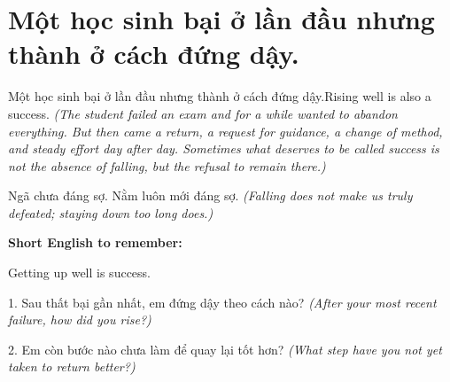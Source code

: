 \section{Một học sinh bại ở lần đầu nhưng thành ở cách đứng dậy.}
\begin{truyen}{Một học sinh bại ở lần đầu nhưng thành ở cách đứng dậy.}{Rising well is also a success.}
\textit{(The student failed an exam and for a while wanted to abandon everything. But then came a return, a request for guidance, a change of method, and steady effort day after day. Sometimes what deserves to be called success is not the absence of falling, but the refusal to remain there.)}
\end{truyen}
\begin{baihoc}
Ngã chưa đáng sợ. Nằm luôn mới đáng sợ.
\textit{(Falling does not make us truly defeated; staying down too long does.)}
\end{baihoc}
\begin{ghinhoanh}
\textbf{Short English to remember:}

Getting up well is success.
\end{ghinhoanh}
\begin{tuhocnhanh}
1. Sau thất bại gần nhất, em đứng dậy theo cách nào? \textit{(After your most recent failure, how did you rise?)}

2. Em còn bước nào chưa làm để quay lại tốt hơn? \textit{(What step have you not yet taken to return better?)}
\end{tuhocnhanh}
\ngancach

